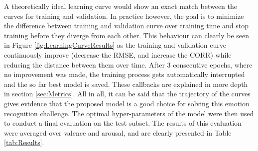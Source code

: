 
A theoretically ideal learning curve would show an exact match between the curves for training and validation. In practice however, the goal is to minimize the difference between training and validation curve over training time and stop training before they diverge from each other. 
\newline\newline
This behaviour can clearly be seen in Figure \ref{fig:LearningCurveResults} as the training and validation curve continuously improve (decrease the RMSE, and increase the CORR) while reducing the distance between them over time. After 3 consecutive epochs, where no improvement was made, the training process gets automatically interrupted and the so far best model is saved. These callbacks are explained in more depth in section \ref{sec:Metrics}.
\newline\newline
All in all, it can be said that the trajectory of the curves gives evidence that the proposed model is a good choice for solving this emotion recognition challenge. The optimal hyper-parameters of the model were then used to conduct a final evaluation on the test subset. The results of this evaluation were averaged over valence and arousal, and are clearly presented in Table \ref{tab:Results}.

